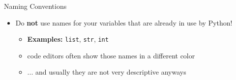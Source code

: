 \begin{frame}{Naming Conventions}

    \begin{itemize}
        \item Do \textbf{not} use names for your variables that are already in use by Python!
        \begin{itemize}
            \item \textbf{Examples:} \texttt{list}, \texttt{str}, \texttt{int}
            \item code editors often show those names in a different color
            \item ... and usually they are not very descriptive anyways
        \end{itemize}
    \end{itemize}

\end{frame}



